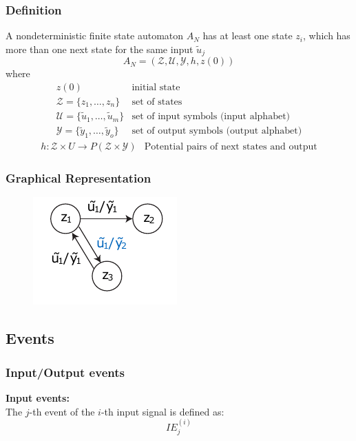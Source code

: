 \documentclass[10pt,a4paper]{article}
\begin{document}
\subsubsection{Definition}
A nondeterministic finite state automaton $A_N$ has at least one state $z_i$, which has more than one next state for the same input $\tilde u_j$
$$
	A_{N} = (\mathcal Z, \mathcal U, \mathcal Y, h, z(0))
$$ where
$$
	\begin{array}{ll}
		z(0) & \text{initial state} \\
		\mathcal Z = \{z_1, \dots, z_n\} & \text{set of states} \\
		\mathcal U = \{\tilde{u}_1, \dots, \tilde{u}_m\} & \text{set of input symbols (input alphabet)} \\
		\mathcal Y = \{\tilde y_1, \dots, \tilde y_o\} & \text{set of output symbols (output alphabet)}
	\end{array}
$$
$$
	\begin{array}{ll}
		h : \mathcal Z \times U → P(\mathcal Z \times \mathcal Y) & \text{Potential pairs of next states and output}
	\end{array}
$$

\subsubsection{Graphical Representation}
\begin{figure}[H]
	\includegraphics[width=0.6\columnwidth]{figures/fsm_nondeterministic.pdf}
\end{figure}


\subsection{Events}
\subsubsection{Input/Output events}
\textbf{Input events:} ~\\
The $j$-th event of the $i$-th input signal is defined as:
$$
	IE^{(i)}_j
$$
\end{document}
